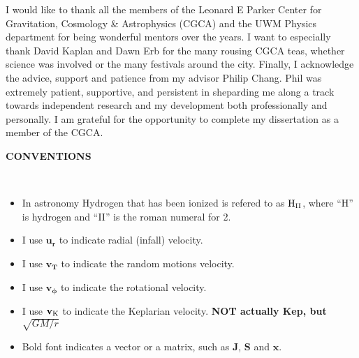 \documentclass[12pt,notitlepage]{report}
\newcommand{\ur}{\mathbf{u_r}}
\newcommand{\vt}{\mathbf{v_T}}
\newcommand{\vkep}{\mathbf{v_{\rm K}}}
\newcommand{\vphi}{\mathbf{v_\phi}}
\newcommand{\HII}{{\rm H}_{\rm II}}
\begin{document}
%
I would like to thank all the members of the Leonard E Parker Center for Gravitation, Cosmology \& Astrophysics (CGCA) and the UWM Physics department for being wonderful mentors over the years. I want to especially thank David Kaplan and Dawn Erb for the many rousing CGCA teas, whether science was involved or the many festivals around the city.
Finally, I acknowledge the advice, support and patience from my advisor Philip Chang. 
Phil was extremely patient, supportive, and persistent in sheparding me along a track towards independent research 
and my development both professionally and personally.
I am grateful for the opportunity to complete my dissertation as a member of the CGCA.

\newpage

\begin{center}
{\Large \bf CONVENTIONS}
\end{center}
\ \\

\begin{itemize} 

\item In astronomy Hydrogen that has been ionized is refered to as $\HII$, where ``H'' is hydrogen and ``II'' is the roman numeral for 2. 

\item I use $\ur$ to indicate radial (infall) velocity.

\item I use $\vt$ to indicate the random motions velocity.

\item I use $\vphi$ to indicate the rotational velocity.

\item I use $\vkep$ to indicate the Keplarian velocity. {\bf NOT actually Kep, but $\sqrt{GM/r}$}

\item Bold font indicates a vector or a matrix, such as $\mathbf{J}$, $\mathbf{S}$ and $\mathbf{x}$.

\end{itemize}
\end{document}
